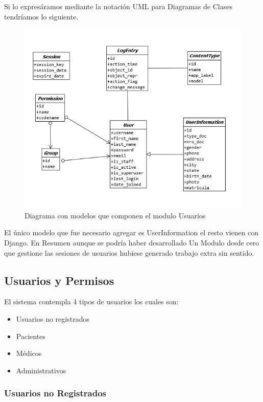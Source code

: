 Si lo expresáramos mediante la notación UML para Diagramas de Clases 
tendríamos lo siguiente.

\begin{figure}[H]
    \centering
    \includegraphics[scale=0.7]{resourse/uml-users.png}
    \caption{Diagrama con modelos que componen el modulo Usuarios}
    \label{fig:07}
\end{figure}

El único modelo que fue necesario agregar es UserInformation el resto vienen
con Django. En Resumen aunque se podría haber desarrollado Un Modulo desde
cero que gestione las sesiones de usuarios hubiese generado trabajo extra sin
sentido.

\subsection{Usuarios y Permisos}

El sistema contempla 4 tipos de usuarios los cuales son: 

\begin{itemize}
    \item Usuarios no registrados 
    \item Pacientes
    \item Médicos
    \item Administrativos
\end{itemize}

\subsubsection{Usuarios no Registrados}

